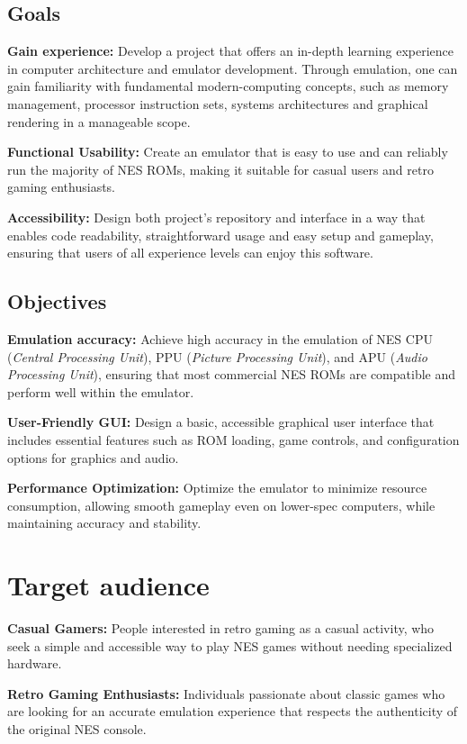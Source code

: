\documentclass{article}
\begin{document}
\subsection{Goals}
\textbf{Gain experience:} Develop a project that offers an in-depth learning experience in computer architecture and emulator development. Through emulation, one can gain familiarity with fundamental modern-computing concepts, such as memory management, processor instruction sets, systems architectures and graphical rendering in a manageable scope.

\noindent\textbf{Functional Usability:} Create an emulator that is easy to use and can reliably run the majority of NES ROMs, making it suitable for casual users and retro gaming enthusiasts.

\noindent\textbf{Accessibility:} Design both project's repository and interface in a way that enables code readability, straightforward usage and easy setup and gameplay, ensuring that users of all experience levels can enjoy this software.

\subsection{Objectives}
\textbf{Emulation accuracy:} Achieve high accuracy in the emulation of NES CPU (\textit{Central Processing Unit}), PPU (\textit{Picture Processing Unit}), and APU (\textit{Audio Processing Unit}), ensuring that most commercial NES ROMs are compatible and perform well within the emulator.

\noindent\textbf{User-Friendly GUI:} Design a basic, accessible graphical user interface that includes essential features such as ROM loading, game controls, and configuration options for graphics and audio.

\noindent\textbf{Performance Optimization:} Optimize the emulator to minimize resource consumption, allowing smooth gameplay even on lower-spec computers, while maintaining accuracy and stability.

\section{Target audience}
\textbf{Casual Gamers:} People interested in retro gaming as a casual activity, who seek a simple and accessible way to play NES games without needing specialized hardware.

\noindent\textbf{Retro Gaming Enthusiasts:} Individuals passionate about classic games who are looking for an accurate emulation experience that respects the authenticity of the original NES console.
\end{document}
